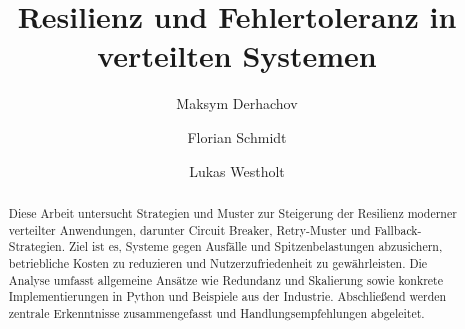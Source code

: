 \documentclass[acmtog]{acmart}
\begin{document}
\title{Resilienz und Fehlertoleranz in verteilten Systemen}

\author{Maksym Derhachov}
\author{Florian Schmidt}
\authornotemark[1]
\author{Lukas Westholt}
\authornotemark[1]
\renewcommand{\shortauthors}{Derhachov, Schmidt und Westholt}

\begin{abstract}

Diese Arbeit untersucht Strategien und Muster zur Steigerung der Resilienz moderner verteilter Anwendungen,
darunter Circuit Breaker, Retry-Muster und Fallback-Strategien.
Ziel ist es, Systeme gegen Ausfälle und Spitzenbelastungen abzusichern, betriebliche Kosten zu reduzieren
und Nutzerzufriedenheit zu gewährleisten.
Die Analyse umfasst allgemeine Ansätze wie Redundanz und Skalierung sowie konkrete Implementierungen in Python
und Beispiele aus der Industrie.
Abschließend werden zentrale Erkenntnisse zusammengefasst und Handlungsempfehlungen abgeleitet.
\end{abstract}

\maketitle










% 
\end{document}
